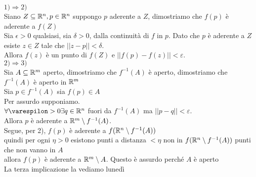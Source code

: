 \documentclass[12px]{article}
\begin{document}
\begin{dimo}
	$1) \Rightarrow  2)$ \\
	Siano $Z\subseteq\mathbb{R}^n, p\in\mathbb{R}^n$ suppongo $p$ aderente a  $Z$, dimostriamo che  $f(p)$ è aderente a $f(Z)$\\
	Sia  $\epsilon > 0 $ qualsiasi, sia $\delta > 0 $, dalla continuità di  $f$ in $p$. Dato che $p$ è aderente a $Z$ esiste  $z\in Z$  tale che  $||z-p|| < \delta$.\\
	Allora  $f(z)$ è un punto di $f(Z)$ e  $||f(p)-f(z)|| < \varepsilon$.\\
	 $2) \Rightarrow 3)$ \\
	 Sia $A\subseteq \mathbb{R}^m$ aperto, dimostriamo che $f^{-1}(A)$ è aperto, dimostriamo che $f^{-1}(A)$ è aperto in $\mathbb{R}^m$\\
	 Sia  $p\in f^{-1}(A)$ sia $f(p)\in A$\\
	 Per assurdo supponiamo.\\
	 $\forall \varespilon > 0 \exists q\in\R^n$ fuori da  $f^{-1}(A)$ ma  $||p-q|| < \varepsilon$.\\
	 Allora $p$ è aderente a  $\mathbb{R}^m\setminus f^{-1}(A)$.\\
	 Segue, per 2),  $f(p)$ è aderente a $f(\mathbb{R}^n\setminus f^{-1}(A))$\\
	 quindi per ogni  $\eta > 0$ esistono punti a distanza  $< \eta$ non in  $f(\mathbb{R}^n\setminus f^{-1}(A))$ punti che non vanno in $A$\\
	 allora  $f(p)$ è aderente a $\mathbb{R}^m\setminus A$. Questo è assurdo perché  $A$ è aperto\\
	 La terza implicazione la vediamo lunedì
\end{dimo}
\end{document}
